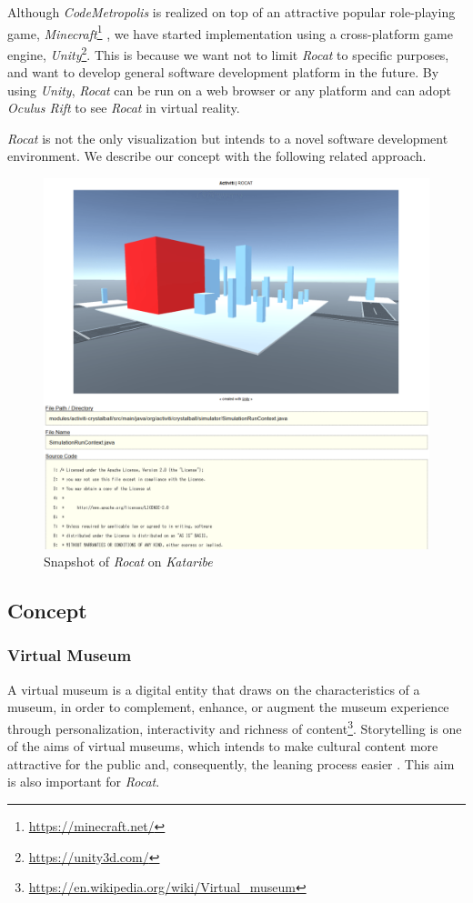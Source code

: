 \documentclass[conference]{IEEEtran}
\begin{document}
Although \textit{CodeMetropolis} is realized on top of an attractive popular role-playing game, \textit{Minecraft}\footnote{\url{https://minecraft.net/}} \cite{6648194}, we have started implementation using a cross-platform game engine, \textit{Unity}\footnote{\url{https://unity3d.com/}}.
This is because we want not to limit \textit{Rocat} to specific purposes, and want to develop general software development platform in the future.
By using \textit{Unity}, \textit{Rocat} can be run on a web browser or any platform and can adopt \textit{Oculus Rift} to see \textit{Rocat} in virtual reality.

\textit{Rocat} is not the only visualization but intends to a novel software development environment.
We describe our concept with the following related approach.

\begin{figure}[tb]
\centering
\includegraphics[width=\linewidth]{Rocat-on-kataribe2.pdf}
\caption{Snapshot of \textit{Rocat} on \textit{Kataribe}}
\label{figure:Rocat-on-kataribe}
\end{figure}


\subsection{Concept}
\subsubsection{Virtual Museum}
A virtual museum is a digital entity that draws on the characteristics of a museum, in order to complement, enhance, or augment the museum
experience through personalization, interactivity and richness of content\footnote{\url{https://en.wikipedia.org/wiki/Virtual_museum}}.
Storytelling is one of the aims of virtual museums, which intends to make cultural content more attractive for the public and, consequently, the leaning process easier \cite{Pietroni:2014:IVR:2635823.2611375}.
This aim is also important for \textit{Rocat}.
\end{document}

